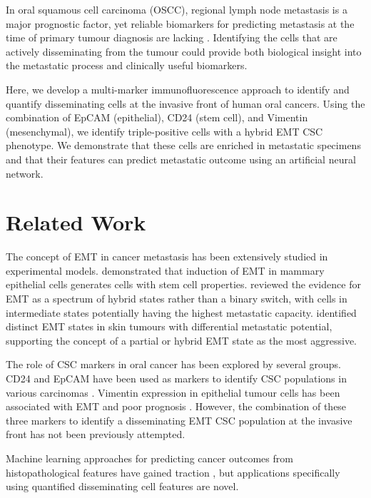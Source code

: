 \documentclass[11pt]{article}
\begin{document}
In oral squamous cell carcinoma (OSCC), regional lymph node metastasis is a major prognostic factor, yet reliable biomarkers for predicting metastasis at the time of primary tumour diagnosis are lacking \citep{leemans2011biology}. Identifying the cells that are actively disseminating from the tumour could provide both biological insight into the metastatic process and clinically useful biomarkers.

Here, we develop a multi-marker immunofluorescence approach to identify and quantify disseminating cells at the invasive front of human oral cancers. Using the combination of EpCAM (epithelial), CD24 (stem cell), and Vimentin (mesenchymal), we identify triple-positive cells with a hybrid EMT CSC phenotype. We demonstrate that these cells are enriched in metastatic specimens and that their features can predict metastatic outcome using an artificial neural network.

\section{Related Work}

The concept of EMT in cancer metastasis has been extensively studied in experimental models. \citet{mani2008mesenchyme} demonstrated that induction of EMT in mammary epithelial cells generates cells with stem cell properties. \citet{nieto2016emt} reviewed the evidence for EMT as a spectrum of hybrid states rather than a binary switch, with cells in intermediate states potentially having the highest metastatic capacity. \citet{pastushenko2018identification} identified distinct EMT states in skin tumours with differential metastatic potential, supporting the concept of a partial or hybrid EMT state as the most aggressive.

The role of CSC markers in oral cancer has been explored by several groups. CD24 and EpCAM have been used as markers to identify CSC populations in various carcinomas \citep{batlle2017cancer}. Vimentin expression in epithelial tumour cells has been associated with EMT and poor prognosis \citep{satelli2011vimentin}. However, the combination of these three markers to identify a disseminating EMT CSC population at the invasive front has not been previously attempted.

Machine learning approaches for predicting cancer outcomes from histopathological features have gained traction \citep{echle2021deep}, but applications specifically using quantified disseminating cell features are novel.
\end{document}
